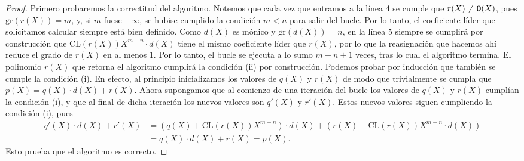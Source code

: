 \begin{proof}
Primero probaremos la correctitud del algoritmo. 
Notemos que cada vez que entramos a la línea 4 se cumple que $r(X) \neq \mathbf{0}(X)$, pues $\mathrm{gr}(r(X)) = m$, y, si $m$ fuese $-\infty$, se hubise cumplido la condición $m < n$ para salir del bucle. Por lo tanto, el coeficiente líder que solicitamos calcular siempre está bien definido.
Como $d(X)$ es mónico y $\mathrm{gr}(d(X)) = n$, en la línea $5$ siempre se cumplirá por construcción que $\mathrm{CL}(r(X)) X^{m-n} \cdot d(X)$ tiene el mismo coeficiente líder que $r(X)$, por lo que la reasignación que hacemos ahí reduce el grado de $r(X)$ en al menos $1$. Por lo tanto, el bucle se ejecuta a lo sumo $m-n+1$ veces, tras lo cual el algoritmo termina. El polinomio $r(X)$ que retorna el algoritmo cumplirá la condición (ii) por construcción. Podemos probar por inducción que también se cumple la condición (i). En efecto, al principio inicializamos los valores de $q(X)$ y $r(X)$ de modo que trivialmente se cumpla que $p(X) = q(X) \cdot d(X) + r(X)$. Ahora supongamos que al comienzo de una iteración del bucle los valores de $q(X)$ y $r(X)$ cumplían la condición (i), y que al final de dicha iteración los nuevos valores son $q'(X)$ y $r'(X)$. Estos nuevos valores siguen cumpliendo la condición (i), pues
\begin{align*}
q'(X) \cdot d(X) + r'(X) &= (q(X)+\mathrm{CL}(r(X))X^{m-n}) \cdot d(X) + (r(X) - \mathrm{CL}(r(X)) X^{m-n} \cdot d(X)) \\
&= q(X) \cdot d(X) + r(X)
= p(X).
\end{align*}
Esto prueba que el algoritmo es correcto.


\end{proof}
